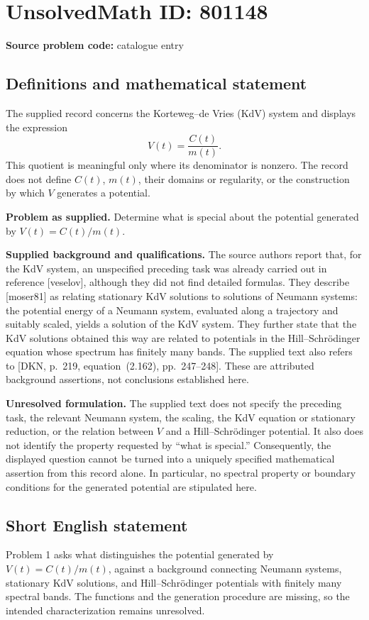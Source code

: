 \documentclass[11pt]{article}
\begin{document}
\section*{UnsolvedMath ID: 801148}
\textbf{Source problem code:} catalogue entry
\subsection{Definitions and mathematical statement}
The supplied record concerns the Korteweg--de Vries (KdV) system and displays the expression
\[
V(t)=\frac{C(t)}{m(t)}.
\]
This quotient is meaningful only where its denominator is nonzero. The record does not define \(C(t)\), \(m(t)\), their domains or regularity, or the construction by which \(V\) generates a potential.

\textbf{Problem as supplied.} Determine what is special about the potential generated by \(V(t)=C(t)/m(t)\).

\textbf{Supplied background and qualifications.} The source authors report that, for the KdV system, an unspecified preceding task was already carried out in reference [veselov], although they did not find detailed formulas. They describe [moser81] as relating stationary KdV solutions to solutions of Neumann systems: the potential energy of a Neumann system, evaluated along a trajectory and suitably scaled, yields a solution of the KdV system. They further state that the KdV solutions obtained this way are related to potentials in the Hill--Schr\"odinger equation whose spectrum has finitely many bands. The supplied text also refers to [DKN, p.~219, equation~(2.162), pp.~247--248]. These are attributed background assertions, not conclusions established here.

\textbf{Unresolved formulation.} The supplied text does not specify the preceding task, the relevant Neumann system, the scaling, the KdV equation or stationary reduction, or the relation between \(V\) and a Hill--Schr\"odinger potential. It also does not identify the property requested by ``what is special.'' Consequently, the displayed question cannot be turned into a uniquely specified mathematical assertion from this record alone. In particular, no spectral property or boundary conditions for the generated potential are stipulated here.
\subsection{Short English statement}
Problem 1 asks what distinguishes the potential generated by \(V(t)=C(t)/m(t)\), against a background connecting Neumann systems, stationary KdV solutions, and Hill--Schr\"odinger potentials with finitely many spectral bands. The functions and the generation procedure are missing, so the intended characterization remains unresolved.
\end{document}
